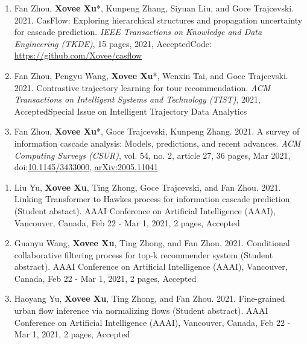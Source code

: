 
\begin{enumerate}[resume]
    \item Fan Zhou, \textbf{Xovee Xu}*, Kunpeng Zhang, Siyuan Liu, and Goce Trajcevski. 2021. CasFlow: Exploring hierarchical structures and propagation uncertainty for cascade prediction. \textit{IEEE Transactions on Knowledge and Data Engineering (TKDE)}, 15 pages, 2021, Accepted\newline Code: {\color{gray}\url{https://github.com/Xovee/casflow}}
    \item Fan Zhou, Pengyu Wang, \textbf{Xovee Xu}*, Wenxin Tai, and Goce Trajcevski. 2021. Contrastive trajectory learning for tour recommendation. \textit{ACM Transactions on Intelligent Systems and Technology (TIST)}, 2021, Accepted\newline Special Issue on Intelligent Trajectory Data Analytics
    \item Fan Zhou, \textbf{Xovee Xu}*, Goce Trajcevski, Kunpeng Zhang. 2021. A survey of information cascade analysis: Models, predictions, and recent advances. \textit{ACM Computing Surveys (CSUR)}, vol. 54, no. 2, article 27, 36 pages, Mar 2021, doi:\href{https://xovee.cn/html/paper-redirects/csur2021.html}{10.1145/3433000}, \href{https://arxiv.org/abs/2005.11041}{arXiv:2005.11041}
\end{enumerate}


\begin{enumerate}[resume]
    \item Liu Yu, \textbf{Xovee Xu}, Ting Zhong, Goce Trajcevski, and Fan Zhou. 2021. Linking Transformer to Hawkes process for information cascade prediction (Student abstact). AAAI Conference on Artificial Intelligence (AAAI), Vancouver, Canada, Feb 22 - Mar 1, 2021, 2 pages, Accepted
    \item Guanyu Wang, \textbf{Xovee Xu}, Ting Zhong, and Fan Zhou. 2021. Conditional collaborative filtering process for top-k recommender system (Student abstract). AAAI Conference on Artificial Intelligence (AAAI), Vancouver, Canada, Feb 22 - Mar 1, 2021, 2 pages, Accepted
    \item Haoyang Yu, \textbf{Xovee Xu}, Ting Zhong, and Fan Zhou. 2021. Fine-grained urban flow inference via normalizing flows (Student abstract). AAAI Conference on Artificial Intelligence (AAAI), Vancouver, Canada, Feb 22 - Mar 1, 2021, 2 pages, Accepted
\end{enumerate}

